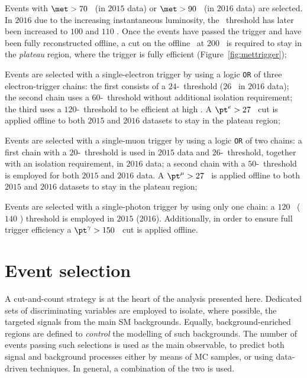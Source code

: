		Events with $\met > 70$ \GeV\ (in $2015$ data) or $\met > 90$ \GeV\ (in $2016$ data) are selected. In $2016$ due to the increasing instantaneous luminosity, the \met\ threshold has later been increased to $100$ and $110$ \GeV. Once the events have passed the trigger and have been fully reconstructed offline, a cut on the offline \met\ at $200$ \GeV\ is required to stay in the \emph{plateau} region, where the trigger is fully efficient (Figure~\ref{fig:mettrigger});

		Events are selected with a single-electron trigger by using a logic \texttt{OR} of three electron-trigger chains: the first consists of a $24$-\GeV\ threshold ($26$ \GeV\ in $2016$ data); the second chain uses a $60$-\GeV\ threshold without additional isolation requirement; the third uses a $120$-\GeV\ threshold to be efficient at high \et. A $\pt^e > 27$ \GeV\ cut is applied offline to both $2015$ and $2016$ datasets to stay in the plateau region;

		Events are selected with a single-muon trigger by using a logic \texttt{OR} of two chains: a first chain with a $20$-\GeV\ threshold is used in $2015$ data and $26$-\GeV\ threshold, together with an isolation requirement, in $2016$ data; a second chain with a $50$-\GeV\ threshold is employed for both $2015$ and $2016$ data. A $\pt^\mu > 27$ \GeV\ is applied offline to both $2015$ and $2016$ datasets to stay in the plateau region;

		Events are selected with a single-photon trigger by using only one chain: a $120$ \GeV\ ($140$ \GeV) threshold is employed in $2015$ ($2016$). Additionally, in order to ensure full trigger efficiency a $\pt^\gamma > 150$ \GeV\ cut is applied offline.


	\section{Event selection}
	\label{sec:evtsel}

		A cut-and-count strategy is at the heart of the analysis presented here. Dedicated sets of discriminating variables are employed to isolate, where possible, the targeted signals from the main \ac{SM} backgrounds. Equally, background-enriched regions are defined to \emph{control} the modelling of such backgrounds. The number of events passing such selections is used as the main observable, to predict both signal and background processes either by means of \ac{MC} samples, or using data-driven techniques. In general, a combination of the two is used. 

